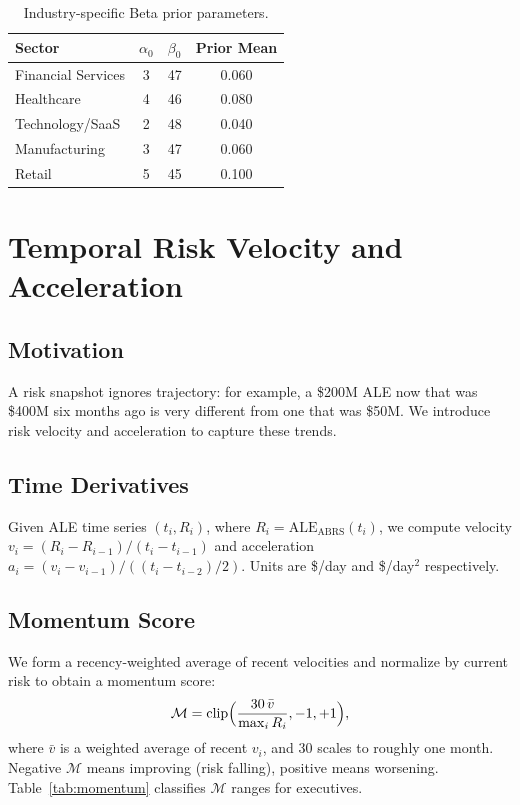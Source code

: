 \documentclass[conference]{IEEEtran}
\newcommand{\ABRS}{\mathrm{ABRS}}
\newcommand{\ALE}{\mathrm{ALE}}
\begin{document}
\begin{table}[h]
  \centering
  \caption{Industry-specific Beta prior parameters.}
  \label{tab:priors}
  \begin{tabular}{lccc}
    \toprule
    Sector & $\alpha_0$ & $\beta_0$ & Prior Mean \\
    \midrule
    Financial Services & 3 & 47 & 0.060 \\
    Healthcare         & 4 & 46 & 0.080 \\
    Technology/SaaS    & 2 & 48 & 0.040 \\
    Manufacturing      & 3 & 47 & 0.060 \\
    Retail             & 5 & 45 & 0.100 \\
    \bottomrule
  \end{tabular}
\end{table}

\section{Temporal Risk Velocity and Acceleration}
\label{sec:trva}

\subsection{Motivation}
A risk snapshot ignores trajectory: for example, a \$200M ALE now that was \$400M six months ago is very different from one that was \$50M. We introduce risk velocity and acceleration to capture these trends.

\subsection{Time Derivatives}
Given ALE time series $(t_i,R_i)$, where $R_i=\ALE_{\ABRS}(t_i)$, we compute velocity $v_i = (R_i - R_{i-1})/(t_i - t_{i-1})$ and acceleration $a_i = (v_i - v_{i-1})/((t_i - t_{i-2})/2)$. Units are \$/day and \$/day$^2$ respectively.

\subsection{Momentum Score}
We form a recency-weighted average of recent velocities and normalize by current risk to obtain a momentum score:
\[
  \mathcal{M} = \mathrm{clip}\Bigl(\frac{30\,\bar{v}}{\max_i R_i}, -1, +1\Bigr),
  \label{eq:momentum}
\]
where $\bar{v}$ is a weighted average of recent $v_i$, and 30 scales to roughly one month. Negative $\mathcal{M}$ means improving (risk falling), positive means worsening. Table~\ref{tab:momentum} classifies $\mathcal{M}$ ranges for executives.
\end{document}
